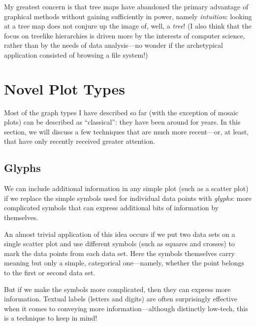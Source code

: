 My greatest concern is that tree maps have abandoned the primary
advantage of graphical methods without gaining sufficiently in power,
namely \emph{intuition}: looking at a tree map does not conjure up the
image of, well, a \emph{tree}! (I also think that the focus on
treelike hierarchies is driven more by the interests of computer
science, rather than by the needs of data analysis---no wonder if the
archetypical application consisted of browsing a file system!)


\section{Novel Plot Types}

Most of the graph types I have described so far (with the exception of
mosaic plots) can be described as ``classical'': they have been around
for years. In this section, we will discuss a few techniques that are
much more recent---or, at least, that have only recently received
greater attention.

\subsection{Glyphs}

 
We can include additional information in any simple plot (such as a
scatter plot) if we replace the simple symbols used for individual
data points with \emph{glyphs}: more complicated symbols that can
express additional bits of information by themselves.

An almost trivial application of this idea occurs if we put two data
sets on a single scatter plot and use different symbols (such as
squares and crosses) to mark the data points from each data set.  Here
the symbols themselves carry meaning but only a simple, categorical
one---namely, whether the point belongs to the first or second data
set.

But if we make the symbols more complicated, then they can express
more information.  Textual labels (letters and digits) are often
surprisingly effective when it comes to conveying more
information---although distinctly low-tech, this is a technique to
keep in mind!

